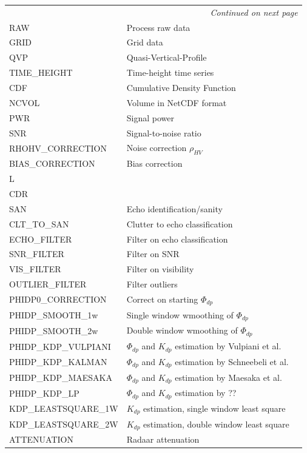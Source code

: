 \documentclass[a4paper,11pt,pdftex,twoside]{scrartcl}
\begin{document}
{{{\begin{longtable}{p{}p{}p{}}
\hline
\multicolumn{3}{r}{\textit{Continued on next page}}\\
\endfoot

\hline
\endlastfoot

RAW & Process raw data &  \\
GRID & Grid data & \\
QVP & Quasi-Vertical-Profile & \\
TIME\_HEIGHT & Time-height time series & \\
CDF & Cumulative Density Function & \\
NCVOL & Volume in NetCDF format & \\
PWR & Signal power & \\
SNR & Signal-to-noise ratio & \\
RHOHV\_CORRECTION & Noise correction $\rho_{HV}$ & \\
BIAS\_CORRECTION & Bias correction & \\
L & &  \\
CDR & & \\
SAN & Echo identification/sanity & \\
CLT\_TO\_SAN & Clutter to echo classification & \\
ECHO\_FILTER & Filter on echo classification & \\
SNR\_FILTER & Filter on SNR & \\
VIS\_FILTER & Filter on visibility & \\
OUTLIER\_FILTER & Filter outliers & \\
PHIDP0\_CORRECTION & Correct on starting $\Phi_{dp}$ & \\
PHIDP\_SMOOTH\_1w & Single window wmoothing of $\Phi_{dp}$ & \\
PHIDP\_SMOOTH\_2w & Double window wmoothing of $\Phi_{dp}$ & \\
PHIDP\_KDP\_VULPIANI & $\Phi_{dp}$ and $K_{dp}$ estimation by Vulpiani et al. & \\
PHIDP\_KDP\_KALMAN & $\Phi_{dp}$ and $K_{dp}$ estimation by Schneebeli et al. & \\
PHIDP\_KDP\_MAESAKA & $\Phi_{dp}$ and $K_{dp}$ estimation by Maesaka et al. & \\
PHIDP\_KDP\_LP & $\Phi_{dp}$ and $K_{dp}$ estimation by ?? & \\
KDP\_LEASTSQUARE\_1W &  $K_{dp}$ estimation, single window least square & \\
KDP\_LEASTSQUARE\_2W &  $K_{dp}$ estimation, double window least square & \\
ATTENUATION &  Radaar attenuation & \\

\end{longtable}}}}
\end{document}
